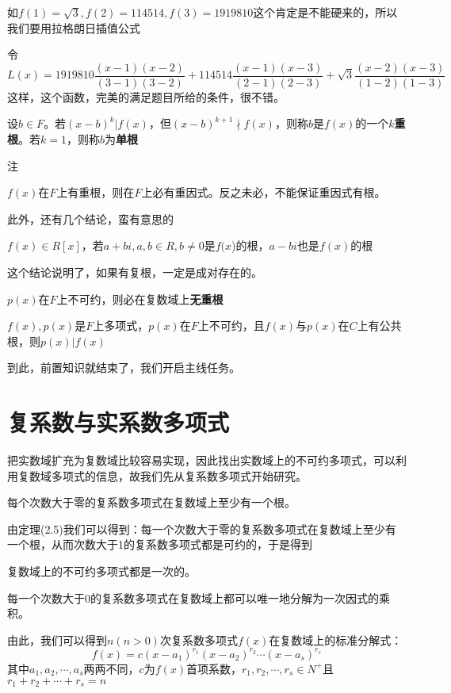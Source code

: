 \documentclass[lang=cn,10pt]{elegantbook}
\begin{document}
如$f(1)=\sqrt{3},f(2)=114514,f(3)=1919810$这个肯定是不能硬来的，所以我们要用拉格朗日插值公式

令
\begin{equation*}
	L(x)=1919810\frac{\left( x-1 \right) \left( x-2 \right)}{\left( 3-1 \right) \left( 3-2 \right)}+114514\frac{\left( x-1 \right) \left( x-3 \right)}{\left( 2-1 \right) \left( 2-3 \right)}+\sqrt{3}\frac{\left( x-2 \right) \left( x-3 \right)}{\left( 1-2 \right) \left( 1-3 \right)}
\end{equation*}
这样，这个函数，完美的满足题目所给的条件，很不错。

\begin{definition}[重根]
	设$b\in F$。若$(x-b)^k|f(x)$，但$(x-b)^{k+1}\nmid f(x)$，则称$b$是$f(x)$的一个$k$\textbf{重根}。若$k=1$，则称$b$为\textbf{单根}
\end{definition}
注

$f(x)$在$F$上有重根，则在$F$上必有重因式。反之未必，不能保证重因式有根。

此外，还有几个结论，蛮有意思的
\begin{conclusion}
	$f(x)\in R[x]$，若$a+bi,a,b\in R,b\neq0$是$f(x$)的根，$a-bi$也是$f(x)$的根
\end{conclusion}
这个结论说明了，如果有复根，一定是成对存在的。
\begin{conclusion}
$	p(x)在F$上不可约，则必在复数域上\textbf{无重根}
\end{conclusion}
\begin{conclusion}
$	f(x),p(x)$是$F$上多项式，$p(x)$在$F$上不可约，且$f(x)与p(x)$在$C$上有公共根，则$p(x)|f(x)$
\end{conclusion}
到此，前置知识就结束了，我们开启主线任务。
\section{复系数与实系数多项式}
把实数域扩充为复数域比较容易实现，因此找出实数域上的不可约多项式，可以利用复数域多项式的信息，故我们先从复系数多项式开始研究。

\begin{theorem}[代数学基本定理]
	每个次数大于零的复系数多项式在复数域上至少有一个根。
\end{theorem}
由定理(2.5)我们可以得到：每一个次数大于零的复系数多项式在复数域上至少有一个根，从而次数大于1的复系数多项式都是可约的，于是得到
\begin{corollary}
	复数域上的不可约多项式都是一次的。
\end{corollary}
\begin{theorem}[复系数多项式唯一因式分解定理]
	每一个次数大于0的复系数多项式在复数域上都可以唯一地分解为一次因式的乘积。
\end{theorem}
由此，我们可以得到$n(n>0)$次复系数多项式$f(x)$在复数域上的标准分解式：
\begin{equation}
	f(x)=c(x-a_1)^{r_1}(x-a_2)^{r_2}\cdots(x-a_s)^{r_s}
\end{equation}
其中$a_1,a_2,\cdots,a_s$两两不同，$c$为$f(x)$首项系数$，r_1,r_2,\cdots,r_s\in N^+$且
$r_1+r_2+\cdots+r_s=n$
\end{document}
